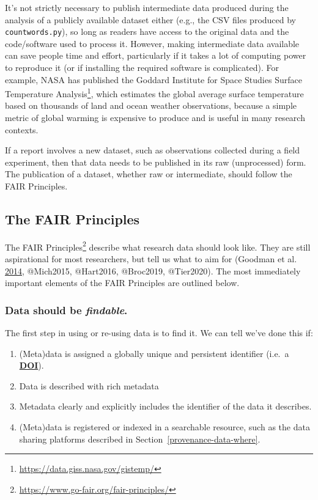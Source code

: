 \documentclass[
]{krantz}
\providecommand{\tightlist}{%
  \setlength{\itemsep}{0pt}\setlength{\parskip}{0pt}}
\renewcommand{\href}[2]{#2\footnote{\url{#1}}}
\newcommand{\gref}[2]{\hyperlink{#2}{\textbf{#1}}}
\begin{document}
It's not strictly necessary to publish intermediate data
produced during the analysis of a publicly available dataset either
(e.g., the CSV files produced by \texttt{countwords.py}),
so long as readers have access to the original data and the code/software used to process it.
However,
making intermediate data available can save people time and effort,
particularly if it takes a lot of computing power to reproduce it
(or if installing the required software is complicated).
For example,
NASA has published
the \href{https://data.giss.nasa.gov/gistemp/}{Goddard Institute for Space Studies Surface Temperature Analysis},
which estimates the global average surface temperature
based on thousands of land and ocean weather observations,
because a simple metric of global warming is expensive to produce
and is useful in many research contexts.

If a report involves a new dataset,
such as observations collected during a field experiment,
then that data needs to be published in its raw (unprocessed) form.
The publication of a dataset,
whether raw or intermediate,
should follow the FAIR Principles.

\hypertarget{provenance-data-fair}{%
\subsection{The FAIR Principles}\label{provenance-data-fair}}

The \href{https://www.go-fair.org/fair-principles/}{FAIR Principles} describe what research data should look like.
They are still aspirational for most researchers,
but tell us what to aim for (Goodman et al. \protect\hyperlink{ref-Good2014}{2014}, @Mich2015, @Hart2016, @Broc2019, @Tier2020).
The most immediately important elements of the FAIR Principles are outlined below.

\hypertarget{data-should-be-findable.}{%
\subsubsection{\texorpdfstring{Data should be \emph{findable}.}{Data should be findable.}}\label{data-should-be-findable.}}

The first step in using or re-using data is to find it.
We can tell we've done this if:

\begin{enumerate}
\def\labelenumi{\arabic{enumi}.}
\tightlist
\item
  (Meta)data is assigned a globally unique and persistent identifier
  (i.e.~a \gref{DOI}{doi}).
\item
  Data is described with rich metadata
\item
  Metadata clearly and explicitly includes the identifier of the data it describes.
\item
  (Meta)data is registered or indexed in a searchable resource,
  such as the data sharing platforms described in Section~\ref{provenance-data-where}.
\end{enumerate}
\end{document}
